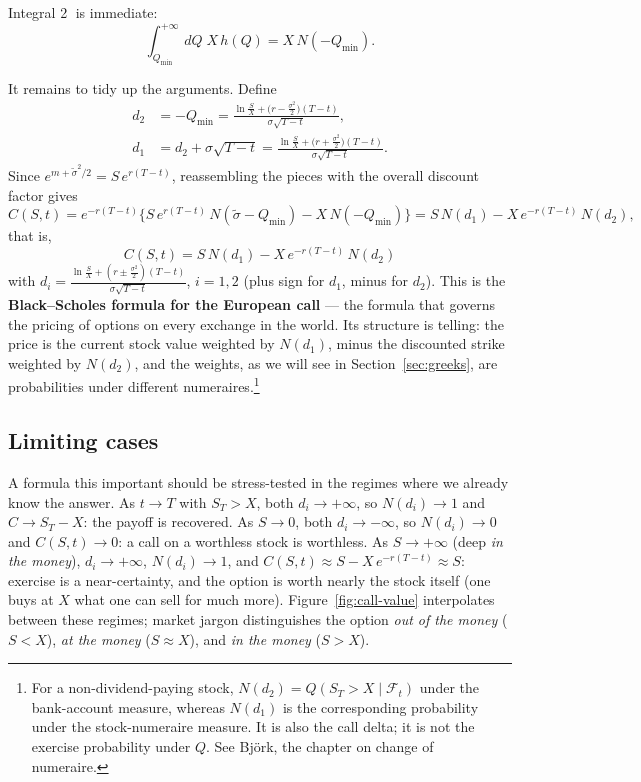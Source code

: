Integral \textcircled{2} is immediate:
\begin{equation}
\int_{Q_{\min}}^{+\infty}\!dQ\; X\, h(Q) = X\, N(-Q_{\min}).
\end{equation}

It remains to tidy up the arguments.
Define
\begin{align}
d_2 &= -Q_{\min} = \frac{\ln\frac{S}{X} + \bigl(r - \frac{\sigma^2}{2}\bigr)(T-t)}{\sigma\sqrt{T-t}}, \label{eq:d2}\\[4pt]
d_1 &= d_2 + \sigma\sqrt{T-t} = \frac{\ln\frac{S}{X} + \bigl(r + \frac{\sigma^2}{2}\bigr)(T-t)}{\sigma\sqrt{T-t}}. \label{eq:d1}
\end{align}
Since $e^{m+\tilde\sigma^2/2} = S\, e^{r(T-t)}$, reassembling the pieces with the overall discount factor gives
\begin{equation}
C(S,t) = e^{-r(T-t)}\bigl\{S\, e^{r(T-t)}\, N(\tilde\sigma - Q_{\min}) - X\, N(-Q_{\min})\bigr\} = S\, N(d_1) - X\, e^{-r(T-t)}\, N(d_2),
\end{equation}
that is,
\begin{equation}\label{eq:bs-call}
\boxed{C(S,t) = S\, N(d_1) - X\, e^{-r(T-t)}\, N(d_2)}
\end{equation}
with $d_i = \frac{\ln\frac{S}{X} + (r \pm \frac{\sigma^2}{2})(T-t)}{\sigma\sqrt{T-t}}$, $i = 1,2$ (plus sign for $d_1$, minus for $d_2$).
This is the \textbf{Black--Scholes formula for the European call} --- the formula that governs the pricing of options on every exchange in the world.
Its structure is telling: the price is the current stock value weighted by $N(d_1)$, minus the discounted strike weighted by $N(d_2)$, and the weights, as we will see in Section~\ref{sec:greeks}, are probabilities under different numeraires.\footnote{For a non-dividend-paying stock, $N(d_2)=Q(S_T>X\mid\mathcal F_t)$ under the bank-account measure, whereas $N(d_1)$ is the corresponding probability under the stock-numeraire measure.
It is also the call delta; it is not the exercise probability under $Q$.
See Bj\"ork\cite{Bjork2020}, the chapter on change of numeraire.}

\subsection{Limiting cases}

A formula this important should be stress-tested in the regimes where we already know the answer.
As $t\to T$ with $S_T > X$, both $d_i \to +\infty$, so $N(d_i)\to 1$ and $C \to S_T - X$: the payoff is recovered. \checkmark
As $S\to 0$, both $d_i\to -\infty$, so $N(d_i)\to 0$ and $C(S,t)\to 0$: a call on a worthless stock is worthless.
As $S\to +\infty$ (deep \emph{in the money}), $d_i\to +\infty$, $N(d_i)\to 1$, and $C(S,t)\approx S - X\,e^{-r(T-t)} \approx S$: exercise is a near-certainty, and the option is worth nearly the stock itself (one buys at $X$ what one can sell for much more).
Figure~\ref{fig:call-value} interpolates between these regimes; market jargon distinguishes the option \emph{out of the money} ($S<X$), \emph{at the money} ($S\approx X$), and \emph{in the money} ($S>X$).

